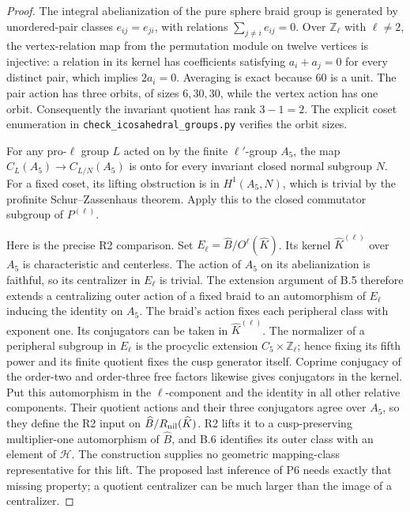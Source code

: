 \begin{proof}
The integral abelianization of the pure sphere braid group is
generated by unordered-pair classes \(e_{ij}=e_{ji}\), with
relations \(\sum_{j\ne i}e_{ij}=0\). Over \(\mathbb Z_\ell\)
with \(\ell\ne2\), the vertex-relation map from the permutation
module on twelve vertices is injective: a relation in its kernel
has coefficients satisfying \(a_i+a_j=0\) for every distinct
pair, which implies \(2a_i=0\). Averaging is exact because
\(60\) is a unit. The pair action has three orbits, of sizes
\(6,30,30\), while the vertex action has one orbit.
Consequently the invariant quotient has rank \(3-1=2\).
The explicit coset enumeration in
\texttt{check\_icosahedral\_groups.py} verifies the orbit sizes.

For any pro-\(\ell\) group \(L\) acted on by the finite
\(\ell'\)-group \(A_5\), the map
\(C_L(A_5)\to C_{L/N}(A_5)\) is onto for every invariant
closed normal subgroup \(N\). For a fixed coset, its lifting
obstruction is in \(H^1(A_5,N)\), which is trivial by the
profinite Schur--Zassenhaus theorem. Apply this to the closed
commutator subgroup of \(P^{(\ell)}\).

Here is the precise R2 comparison. Set
\(E_\ell=\widehat B/O^\ell(\widehat K)\). Its kernel
\(\widehat K^{(\ell)}\) over \(A_5\) is characteristic and
centerless. The action of \(A_5\) on its abelianization is
faithful, so its centralizer in \(E_\ell\) is trivial.
The extension argument of B.5 therefore extends a centralizing
outer action of a fixed braid to an automorphism of \(E_\ell\)
inducing the identity on \(A_5\). The braid's action fixes
each peripheral class with exponent one. Its conjugators can
be taken in \(\widehat K^{(\ell)}\). The normalizer of a
peripheral subgroup in \(E_\ell\) is the procyclic extension
\(C_5\times\mathbb Z_\ell\); hence fixing its fifth power
and its finite quotient fixes the cusp generator itself.
Coprime conjugacy of the order-two and order-three free factors
likewise gives conjugators in the kernel. Put this automorphism
in the \(\ell\)-component and the identity in all other relative
components. Their quotient actions and their three conjugators
agree over \(A_5\), so they define the R2 input on
\(\widehat B/R_{\rm nil}(\widehat K)\). R2 lifts it to a
cusp-preserving multiplier-one automorphism of \(\widehat B\),
and B.6 identifies its outer class with an element of
\(\mathcal H\). The construction supplies no geometric
mapping-class representative for this lift. The proposed last
inference of P6 needs exactly that missing property; a quotient
centralizer can be much larger than the image of a centralizer.
\end{proof}


